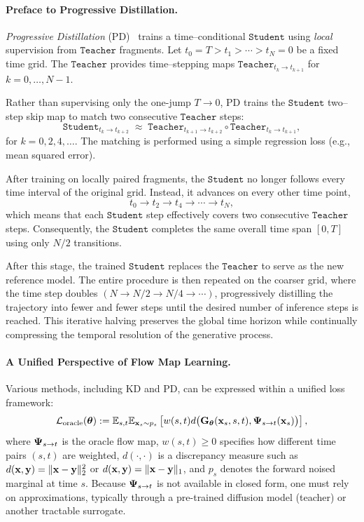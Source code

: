 \paragraph{Preface to Progressive Distillation.}
\emph{Progressive Distillation} (PD)~\citep{salimans2021progressive} trains a time–conditional $ \mathtt{Student} $ using \emph{local} supervision from $\mathtt{Teacher}$ fragments. 
Let $t_0=T>t_1>\cdots>t_N=0$ be a fixed time grid. 
The $ \mathtt{Teacher} $ provides time–stepping maps $\mathtt{Teacher}_{t_k\to t_{k+1}}$ for $k=0,\ldots,N-1$.


Rather than supervising only the one-jump $T\to 0$, PD trains the $ \mathtt{Student}  $ two–step skip map to match two consecutive $ \mathtt{Teacher}$ steps:
\[
\mathtt{Student}_{t_k\to t_{k+2}}
\;\approx\;
\mathtt{Teacher}_{t_{k+1}\to t_{k+2}}
\circ
\mathtt{Teacher}_{t_{k}\to t_{k+1}},
\]
for $k = 0, 2, 4, \dots$.
The matching is performed using a simple regression loss (e.g., mean squared error).


After training on locally paired fragments, the $ \mathtt{Student} $ no longer follows every time interval of the original grid. 
Instead, it advances on every other time point,
\[
t_0 \to t_2 \to t_4 \to \cdots \to t_N,
\]
which means that each $ \mathtt{Student} $ step effectively covers two consecutive $ \mathtt{Teacher}$  steps. 
Consequently, the $ \mathtt{Student} $ completes the same overall time span $[0,T]$ using only $N/2$ transitions. 

After this stage, the trained $ \mathtt{Student} $ replaces the $ \mathtt{Teacher}$  to serve as the new reference model. 
The entire procedure is then repeated on the coarser grid, where the time step doubles 
$(N \to N/2 \to N/4 \to \cdots)$,
progressively distilling the trajectory into fewer and fewer steps until the desired number of inference steps is reached. 
This iterative halving preserves the global time horizon while continually compressing the temporal resolution of the generative process.






\paragraph{A Unified Perspective of Flow Map Learning.}
Various methods, including KD and PD, can be expressed within a unified loss framework:
\begin{align}\label{eq:general-cm-loss}
  \mathcal{L}_{\mathrm{oracle}}({\bm{\theta}})
  := \mathbb{E}_{s,t} \mathbb{E}_{{\mathbf{x}}_s \sim p_s} 
  \left[  w(s,t)  d \big({\mathbf{G}}_{\bm{\theta}}({\mathbf{x}}_s, s,t),  {\bm{\Psi}}_{s\to t}({\mathbf{x}}_s)\big)\right],
\end{align}
where ${\bm{\Psi}}_{s\to t}$ is the oracle flow map, $w(s,t) \geq 0$ specifies how different time pairs $(s,t)$ are weighted,
$d(\cdot,\cdot)$ is a discrepancy measure such as
$d({\mathbf{x}},{\mathbf{y}})=\|{\mathbf{x}}-{\mathbf{y}}\|_2^2$ or $d({\mathbf{x}},{\mathbf{y}})=\|{\mathbf{x}}-{\mathbf{y}}\|_1$,  and $p_s$ denotes the
forward noised marginal at time $s$. Because ${\bm{\Psi}}_{s\to t}$ is not available
in closed form, one must rely on approximations, typically through a pre-trained
diffusion model (teacher) or another tractable surrogate.

